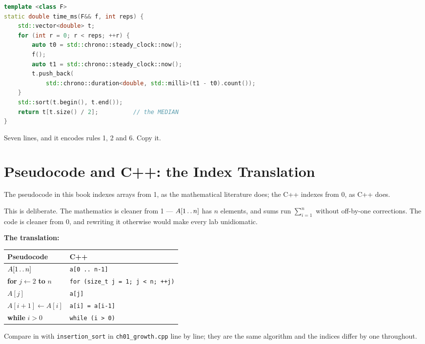 \begin{conceptbox}
\begin{lstlisting}[language=C++]
template <class F>
static double time_ms(F&& f, int reps) {
    std::vector<double> t;
    for (int r = 0; r < reps; ++r) {
        auto t0 = std::chrono::steady_clock::now();
        f();
        auto t1 = std::chrono::steady_clock::now();
        t.push_back(
            std::chrono::duration<double, std::milli>(t1 - t0).count());
    }
    std::sort(t.begin(), t.end());
    return t[t.size() / 2];          // the MEDIAN
}
\end{lstlisting}
Seven lines, and it encodes rules 1, 2 and 6. Copy it.
\end{conceptbox}

\section{Pseudocode and C++: the Index Translation}

\begin{alertbox}
The pseudocode in this book indexes arrays from 1, as the mathematical
literature does; the C++ indexes from 0, as C++ does.

\smallskip
This is deliberate. The mathematics is cleaner from 1 --- $A[1
\mathinner{\ldotp\ldotp} n]$ has $n$ elements, and sums run $\sum_{i=1}^{n}$
without off-by-one corrections. The code is cleaner from 0, and rewriting it
otherwise would make every lab unidiomatic.

\smallskip
\textbf{The translation:}
\begin{center}
\begin{tabular}{@{}ll@{}}
\toprule
\rowcolor{primary!15}
\textbf{Pseudocode} & \textbf{C++} \\
\midrule
$A[1 \mathinner{\ldotp\ldotp} n]$ & \texttt{a[0 .. n-1]} \\
\textbf{for} $j \gets 2$ \textbf{to} $n$ & \texttt{for (size\_t j = 1; j < n; ++j)} \\
$A[j]$ & \texttt{a[j]} \\
$A[i+1] \gets A[i]$ & \texttt{a[i] = a[i-1]} \\
\textbf{while} $i > 0$ & \texttt{while (i > 0)} \\
\bottomrule
\end{tabular}
\end{center}

\smallskip
Compare  in  with
\texttt{insertion\_sort} in \texttt{ch01\_growth.cpp} line by line; they are the
same algorithm and the indices differ by one throughout.
\end{alertbox}


